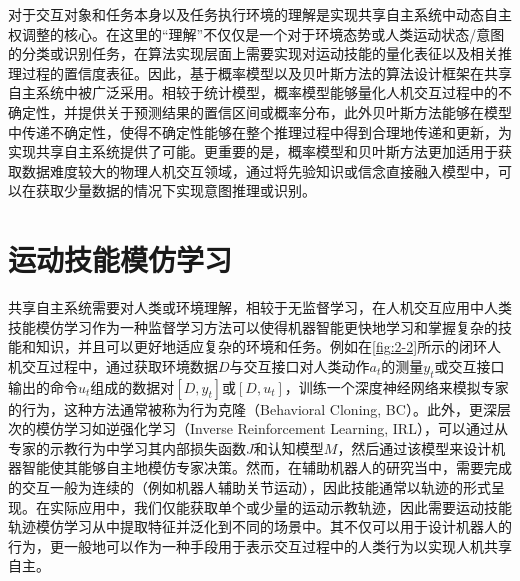 对于交互对象和任务本身以及任务执行环境的理解是实现共享自主系统中动态自主权调整的核心。在这里的``理解''不仅仅是一个对于环境态势或人类运动状态/意图的分类或识别任务，在算法实现层面上需要实现对运动技能的量化表征以及相关推理过程的置信度表征。因此，基于概率模型以及贝叶斯方法的算法设计框架在共享自主系统中被广泛采用。相较于统计模型，概率模型能够量化人机交互过程中的不确定性，并提供关于预测结果的置信区间或概率分布，此外贝叶斯方法能够在模型中传递不确定性，使得不确定性能够在整个推理过程中得到合理地传递和更新，为实现共享自主系统提供了可能。更重要的是，概率模型和贝叶斯方法更加适用于获取数据难度较大的物理人机交互领域，通过将先验知识或信念直接融入模型中，可以在获取少量数据的情况下实现意图推理或识别。

\section{运动技能模仿学习}
共享自主系统需要对人类或环境理解，相较于无监督学习，在人机交互应用中人类技能模仿学习作为一种监督学习方法可以使得机器智能更快地学习和掌握复杂的技能和知识，并且可以更好地适应复杂的环境和任务。例如在\ref{fig:2-2}所示的闭环人机交互过程中，通过获取环境数据$D$与交互接口对人类动作$a_t$的测量$y_t$或交互接口输出的命令$u_t$组成的数据对$[D,y_t]$或$[D,u_t]$，训练一个深度神经网络来模拟专家的行为，这种方法通常被称为行为克隆（Behavioral Cloning, BC）。此外，更深层次的模仿学习如逆强化学习（Inverse Reinforcement Learning, IRL），可以通过从专家的示教行为中学习其内部损失函数$J$和认知模型$M$，然后通过该模型来设计机器智能使其能够自主地模仿专家决策。然而，在辅助机器人的研究当中，需要完成的交互一般为连续的（例如机器人辅助关节运动），因此技能通常以轨迹的形式呈现。在实际应用中，我们仅能获取单个或少量的运动示教轨迹，因此需要运动技能轨迹模仿学习从中提取特征并泛化到不同的场景中。其不仅可以用于设计机器人的行为，更一般地可以作为一种手段用于表示交互过程中的人类行为以实现人机共享自主。

